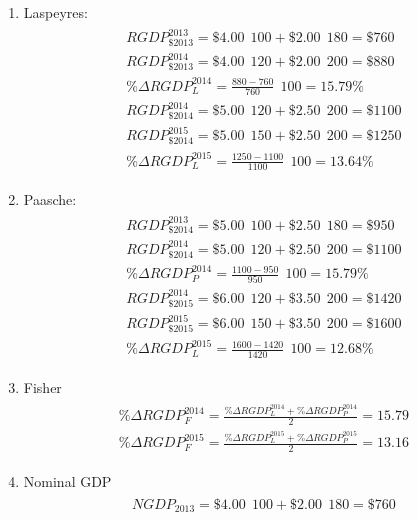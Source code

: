 \documentclass[letterpaper,12pt]{article}
\theoremstyle{dotlessS}
\begin{document}
\begin{enumerate}
\item Laspeyres:
\begin{eqnarray*}
\begin{array}{l}
RGDP_{\$2013}^{2013}=\$4.00 \: \: 100+\$2.00 \: \: 180=\$760  \\[1.2ex]
RGDP_{\$2013}^{2014}=\$4.00 \: \: 120+\$2.00 \: \: 200=\$880  \\[1.2ex]
\% \Delta RGDP_L^{2014}=\frac{880-760}{760} \: \: 100=15.79\%   \\[1.4ex]
RGDP_{\$2014}^{2014}=\$5.00 \: \: 120+\$2.50 \: \: 200=\$1100  \\[1.2ex]
RGDP_{\$2014}^{2015}=\$5.00 \: \: 150+\$2.50 \: \: 200=\$1250  \\[1.2ex]
\% \Delta RGDP_L^{2015}=\frac{1250-1100}{1100} \: \: 100=13.64\%  
\end{array}
\end{eqnarray*}
\item Paasche:
\begin{eqnarray*}
\begin{array}{l}
RGDP_{\$2014}^{2013}=\$5.00 \: \: 100+\$2.50 \: \: 180=\$950 \\[1.2ex]
RGDP_{\$2014}^{2014}=\$5.00 \: \: 120+\$2.50 \: \: 200=\$1100  \\[1.2ex]
\% \Delta RGDP_P^{2014}=\frac{1100-950}{950} \: \: 100=15.79\%   \\[1.4ex]
RGDP_{\$2015}^{2014}=\$6.00 \: \: 120+\$3.50 \: \: 200=\$1420  \\[1.2ex]
RGDP_{\$2015}^{2015}=\$6.00 \: \: 150+\$3.50 \: \: 200=\$1600  \\[1.2ex]
\% \Delta RGDP_L^{2015}=\frac{1600-1420}{1420} \: \: 100=12.68\%  
\end{array}
\end{eqnarray*}
\item Fisher
\begin{eqnarray*}
\begin{array}{l}
\% \Delta RGDP_F^{2014}=\frac{\% \Delta RGDP_L^{2014}+\% \Delta RGDP_P^{2014}}{2}=15.79 \\[1.4ex]
\% \Delta RGDP_F^{2015}=\frac{\% \Delta RGDP_L^{2015}+\% \Delta RGDP_P^{2015}}{2}=13.16
\end{array}
\end{eqnarray*}
\item Nominal GDP
\begin{eqnarray*}
\begin{array}{l}
NGDP_{2013}=\$4.00 \: \: 100+\$2.00 \: \: 180=\$760  \\[1.2ex]

\end{array}
\end{eqnarray*}
\end{enumerate}
\end{document}
